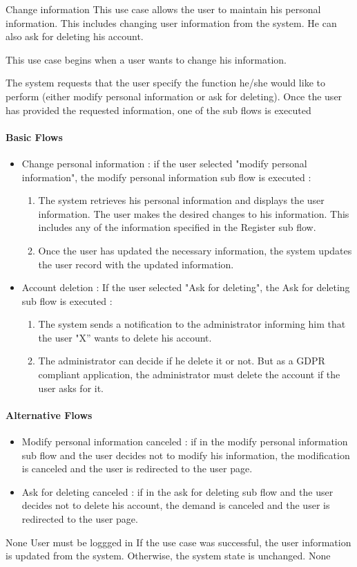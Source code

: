 \usecasedesc
{Change information}
{
  This use case allows the user to maintain his personal information. This includes changing user information from the system. He can also ask for deleting his account.
}
{
  This use case begins when a user wants to change his information.

  The system requests that the user specify the function he/she would like to perform (either modify personal information or ask for deleting). Once the user has provided the requested information, one of the sub flows is executed

  \paragraph{Basic Flows}
  \begin{itemize}
    \item Change personal information : if the user selected "modify personal information", the modify personal information sub flow is executed :
    \begin{enumerate}
      \item The system retrieves his personal information and displays the user information. The user makes the desired changes to his information. This includes any of the information specified in the Register sub flow.
      \item Once the user has updated the necessary information, the system updates the user record with the updated information.
    \end{enumerate}
    \item Account deletion : If the user selected "Ask for deleting", the Ask for deleting sub flow is executed :
    \begin{enumerate}
      \item The system sends a notification to the administrator informing him that the user "X” wants to delete his account.
      \item The administrator can decide if he delete it or not. But as a GDPR compliant application, the administrator must delete the account if the user asks for it.
    \end{enumerate}
  \end{itemize}

  \paragraph{Alternative Flows}
  \begin{itemize}
    \item Modify personal information canceled : if in the modify personal information sub flow and the user decides not to modify his information, the modification is canceled and the user is redirected to the user page.
    \item Ask for deleting canceled : if in the ask for deleting sub flow and the user decides not to delete his account, the demand is canceled and the user is redirected to the user page.
  \end{itemize}
}
{None}
{User must be loggged in}
{If the use case was successful, the user information is updated from the system.  Otherwise, the system state is unchanged.}
{None}

